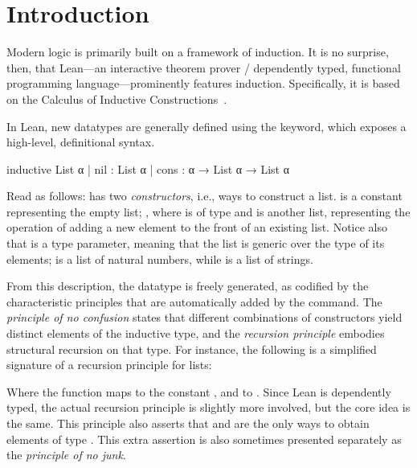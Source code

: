 \chapter{Introduction}
\label{ch:intro}


Modern logic is primarily built on a framework of induction.
It is no surprise, then, that Lean---an interactive theorem prover / dependently typed, functional programming language---prominently features induction.
Specifically, it is based on the Calculus of Inductive Constructions~\cite{avigadTheoremProvingLean}.

In Lean, new datatypes are generally defined using the \inductive{} keyword, which exposes a high-level, definitional syntax.

\begin{leancode}
  inductive List α 
    | nil  : List α
    | cons : α → List α → List α
\end{leancode}

Read as follows:  has two \emph{constructors}, i.e., ways to construct a list.
 is a constant
representing the empty list; 
, where  is of type  and  is another list, representing the operation of adding a new element to the front of an existing list. Notice also that  is a type parameter, meaning that the list is generic over the type of its elements;  is a list of natural numbers, while  is a list of strings.

From this description, the datatype is freely generated, as codified by the characteristic principles that are automatically added by the \inductive{} command.
The \emph{principle of no confusion} states that different combinations of constructors yield distinct elements of the inductive type, and the \emph{recursion principle} embodies structural recursion on that type. For instance, the following is a simplified signature of a recursion principle for lists:
\begin{center}
\end{center}
Where the function  maps  to the constant , and  to . Since Lean is dependently typed, the actual recursion principle is slightly more involved, but the core idea is the same.
This principle also asserts that  and  are the only ways to obtain elements of type . This extra assertion is also sometimes presented separately as the \emph{principle of no junk}.


